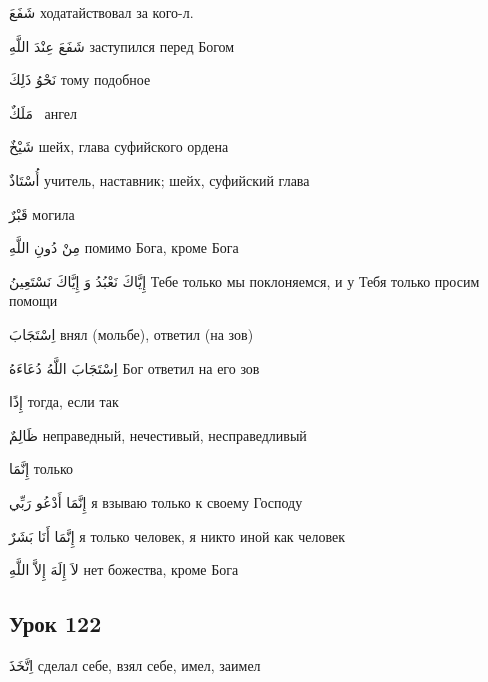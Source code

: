 \documentclass[a5paper]{article}
\newcommand\textstyleDropCaps[1]{#1}
\newcommand\textstyleCaptioncharacters[1]{#1}
\begin{document}
\textstyleCaptioncharacters{شَفَعَ }\textstyleDropCaps{ходатайствовал за кого-л.‎}

\textstyleCaptioncharacters{شَفَعَ عِنْدَ اللَّهِ }\textstyleDropCaps{засту­пился перед Богом‎}

\textstyleCaptioncharacters{نَحْوُ ذَلِكَ }\textstyleDropCaps{тому подобное‎}

\textstyleCaptioncharacters{مَلَكٌ \ }\textstyleDropCaps{ангел ‎}

\textstyleCaptioncharacters{شَيْخٌ }\textstyleDropCaps{шейх, глава суфий­ского ордена‎}

\textstyleCaptioncharacters{أُسْتَاذٌ }\textstyleDropCaps{учитель, настав­ник; шейх, суфийский глава‎}

\textstyleCaptioncharacters{قَبْرٌ }\textstyleDropCaps{могила‎}

\textstyleCaptioncharacters{مِنْ دُونِ اللَّهِ }\textstyleDropCaps{помимо Бога, кроме Бога‎}

\textstyleCaptioncharacters{إِيَّاكَ نَعْبُدُ وَ إِيَّاكَ نَسْتَعِينُ }\textstyleDropCaps{Тебе только мы поклоняемся, и у Тебя только просим помощи‎}

\textstyleCaptioncharacters{اِسْتَجَابَ }\textstyleDropCaps{внял (мольбе), ответил (на зов)‎}

\textstyleCaptioncharacters{اِسْتَجَابَ اللَّهُ دُعَاءَهُ }\textstyleDropCaps{Бог ответил на его зов ‎}

\textstyleCaptioncharacters{إِذًا }\textstyleDropCaps{тогда, если так‎}

\textstyleCaptioncharacters{ظَالِمٌ }\textstyleDropCaps{неправедный, нече­стивый, несправедливый‎}

\textstyleCaptioncharacters{إِنَّمَا }\textstyleDropCaps{только‎}

\textstyleCaptioncharacters{إِنَّمَا أَدْعُو رَبِّي }\textstyleDropCaps{я взы­ваю только к своему Господу‎}

\textstyleCaptioncharacters{إِنَّمَا أَنَا بَشَرٌ }\textstyleDropCaps{я только че­ловек, я никто иной как человек‎}

\textstyleCaptioncharacters{لاَ إِلَهَ إِلاَّ اللَّهِ }\textstyleDropCaps{нет боже­ства, кроме Бога‎}

\subsection[Урок 122‎]{\textstyleDropCaps{Урок 122‎}}
\textstyleCaptioncharacters{اِتَّخَذَ }\textstyleDropCaps{сделал себе, взял себе, имел, заимел‎}
\end{document}
